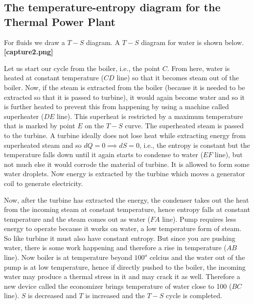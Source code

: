 \documentclass{report}
\begin{document}
\subsection{The temperature-entropy diagram for the Thermal Power Plant}
For fluids we draw a $T-S$ diagram. A $T-S$ diagram for water is shown below. 
\\
{\bf [capture2.png]}
\par Let us start our cycle from the boiler, i.e., the point $C$. From here, water is heated at constant temperature ($CD$ line) so that it becomes steam out of the boiler. Now, if the steam is extracted from the boiler (because it is needed to be extracted so that it is passed to turbine), it would again become water and so it is further heated to prevent this from happening by using a machine called superheater ($DE$ line). This superheat is restricted by a maximum temperature that is marked by point $E$ on the $T-S$ curve.  The superheated steam is passed to the turbine. A turbine ideally does not lose heat while extracting energy from superheated steam and so $dQ = 0 \implies dS = 0$, i.e., the entropy is constant but the temperature falls down until it again starts to condense to water ($EF$ line), but not much else it would corrode the material of turbine. It is allowed to form some water droplets. Now energy is extracted by the turbine which moves a generator coil to generate electricity.

\par Now, after the turbine has extracted the energy, the condenser takes out the heat from the incoming steam at constant temperature, hence entropy falls at constant temperature and the steam comes out as water ($FA$ line). Pump requires less energy to operate because it works on water, a low temperature form of steam. So like turbine it must also have constant entropy. But since you are pushing water, there is some work happening and therefore a rise in temperature ($AB$ line). Now boiler is at temperature beyond $100^{o}$ celcius and the water out of the pump is at low temperature, hence if directly pushed to the boiler, the incoming water may produce a thermal stress in it and may crack it as well.  Therefore a new device called the economizer brings temperature of water close to 100 ($BC$ line). $S$ is decreased and $T$ is increased and the $T-S$ cycle is completed.
\end{document}

